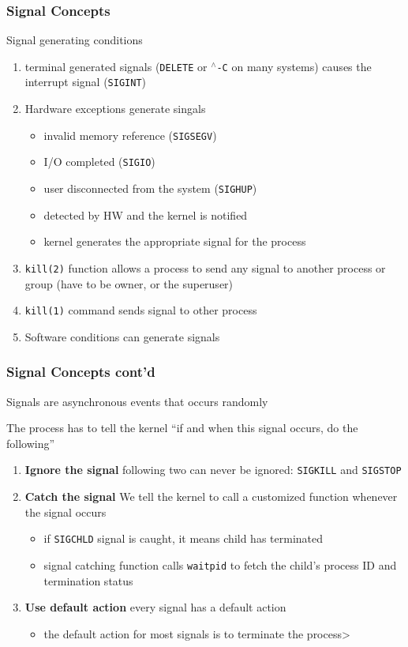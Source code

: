 \documentclass[newPxFont,sthlmFooter,nooffset]{beamer}
\begin{document}
\begin{frame}[t]
  \frametitle{Signal Concepts}
Signal generating conditions
\begin{enumerate}
\item <1-> terminal generated signals (\texttt{DELETE} or \texttt{$^\wedge$-C} on many systems) causes the interrupt signal (\texttt{SIGINT})
\item <2-> Hardware exceptions generate singals
  \begin{itemize}
  \item <2-> invalid memory reference (\texttt{SIGSEGV})
  \item <2-> I/O completed (\texttt{SIGIO})
  \item <2-> user disconnected from the system (\texttt{SIGHUP})
  \item <2-> detected by HW and the kernel is notified
  \item <2-> kernel generates the appropriate signal for the process
  \end{itemize}
\item <3-> \texttt{kill(2)} function allows a process to send any signal to another process or group (have to be owner, or the superuser)
\item <4-> \texttt{kill(1)} command sends signal to other process
\item <5-> Software conditions can generate signals
\end{enumerate}

\end{frame}

\begin{frame}
  \frametitle{Signal Concepts cont'd}
Signals are asynchronous events that occurs randomly

The process has to tell the kernel ``if and when this signal occurs, do the following''

\begin{enumerate}
\item <2-> \textbf{Ignore the signal} following two can never be ignored: \texttt{SIGKILL} and \texttt{SIGSTOP} 
\item <3-> \textbf{Catch the signal} We tell the kernel to call a customized function whenever the signal occurs
  \begin{itemize}
  \item <3-> if \texttt{SIGCHLD} signal is caught, it means child has terminated
  \item <3-> signal catching function calls \texttt{waitpid} to fetch the child's process ID and termination status
  \end{itemize}
\item <4-> \textbf{Use default action} every signal has a default action
  \begin{itemize}
  \item <4-> the default action for most signals is to terminate the process> 
  \end{itemize}
\end{enumerate}

\end{frame}
\end{document}
